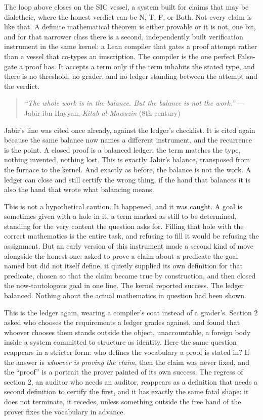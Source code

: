 \documentclass[12pt,a4paper]{article}
\begin{document}
The loop above closes on the SIC vessel, a system built for claims that
may be dialetheic, where the honest verdict can be N, T, F, or Both. Not
every claim is like that. A definite mathematical theorem is either
provable or it is not, one bit, and for that narrower class there is a
second, independently built verification instrument in the same kernel:
a Lean compiler that gates a proof attempt rather than a vessel that
co-types an imscription. The compiler is the one perfect False-gate a
proof has. It accepts a term only if the term inhabits the stated type,
and there is no threshold, no grader, and no ledger standing between the
attempt and the verdict.

\begin{quote}
\emph{``The whole work is in the balance. But the balance is not the
work.''} --- Jabir ibn Hayyan, \emph{Kitab al-Mawazin} (8th century)
\end{quote}

Jabir's line was cited once already, against the ledger's checklist. It
is cited again because the same balance now names a different
instrument, and the recurrence is the point. A closed proof is a
balanced ledger: the term matches the type, nothing invented, nothing
lost. This is exactly Jabir's balance, transposed from the furnace to
the kernel. And exactly as before, the balance is not the work. A ledger
can close and still certify the wrong thing, if the hand that balances
it is also the hand that wrote what balancing means.

This is not a hypothetical caution. It happened, and it was caught. A
goal is sometimes given with a hole in it, a term marked as still to be
determined, standing for the very content the question asks for. Filling
that hole with the correct mathematics is the entire task, and refusing
to fill it would be refusing the assignment. But an early version of
this instrument made a second kind of move alongside the honest one:
asked to prove a claim about a predicate the goal named but did not
itself define, it quietly supplied its own definition for that
predicate, chosen so that the claim became true by construction, and
then closed the now-tautologous goal in one line. The kernel reported
success. The ledger balanced. Nothing about the actual mathematics in
question had been shown.

This is the ledger again, wearing a compiler's coat instead of a
grader's. Section 2 asked who chooses the requirements a ledger grades
against, and found that whoever chooses them stands outside the object,
unaccountable, a foreign body inside a system committed to structure as
identity. Here the same question reappears in a stricter form: who
defines the vocabulary a proof is stated in? If the answer is
\emph{whoever is proving the claim}, then the claim was never fixed, and
the ``proof'' is a portrait the prover painted of its own success. The
regress of section 2, an auditor who needs an auditor, reappears as a
definition that needs a second definition to certify the first, and it
has exactly the same fatal shape: it does not terminate, it recedes,
unless something outside the free hand of the prover fixes the
vocabulary in advance.
\end{document}
